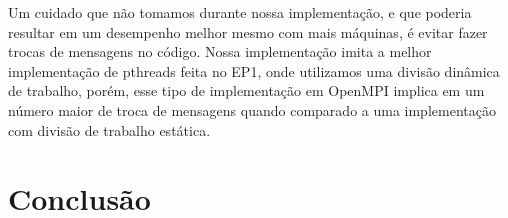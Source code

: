 \documentclass[12pt]{article}
\begin{document}
Um cuidado que não tomamos durante nossa implementação, e que poderia
resultar em um desempenho melhor mesmo com mais máquinas, é evitar fazer
trocas de mensagens no código. Nossa implementação imita a melhor 
implementação de pthreads feita no EP1, onde utilizamos uma divisão
dinâmica de trabalho, porém, esse tipo de implementação em OpenMPI 
implica em um número maior de troca de mensagens quando comparado a uma
implementação com divisão de trabalho estática.

\newpage
\section{Conclusão}

\newpage
\end{document}
